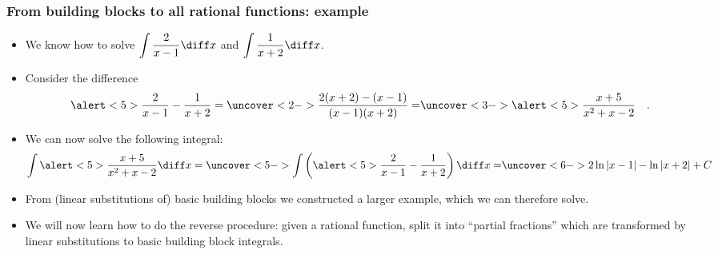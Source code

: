 \begin{frame}
\frametitle{From building blocks to all rational functions: example}
\begin{itemize}
\item We know how to solve $\displaystyle \int \frac{2}{x-1}\diff x$ and $\displaystyle \int \frac{1}{x+2}\diff x$. 
\item Consider the difference
\[
\alert<5>{\frac{2}{x-1} - \frac{1}{x+2} } = %
\uncover<2->{%
\frac{2(x+2) - (x-1)}{(x-1)(x+2)} = %
}%
\uncover<3->{%
\alert<5>{ \frac{x + 5}{x^2+x-2} }\quad .
}%
\]
\item<4-> 

We can now solve the following integral:
\[
\int \alert<5>{ \frac{x+5}{x^2+x-2}}\diff x = %
\uncover<5->{%
\int \left(\alert<5>{\frac{2}{x-1} - \frac{1}{x+2}} \right) \diff x = %
}%
\uncover<6->{%
2\ln | x - 1| - \ln | x + 2| + C
}%
\]
\item<7-> From  (linear substitutions of) basic building blocks we constructed a larger example, which we can therefore solve. 
\item<8-> We will now learn how to do the reverse procedure: given a rational function, split it into ``partial fractions'' which are transformed by linear substitutions to basic building block integrals.
\end{itemize}
\end{frame}
